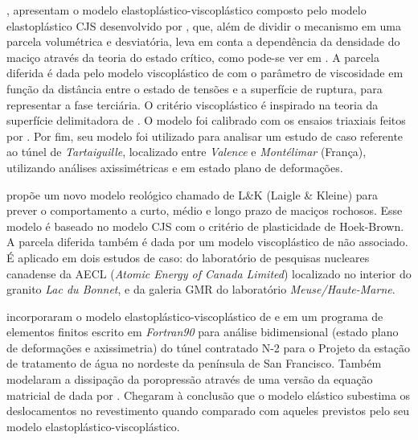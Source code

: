 \textbf{}, apresentam o modelo elastoplástico-viscoplástico composto pelo modelo elastoplástico CJS desenvolvido por , que, além de dividir o mecanismo em uma parcela volumétrica e desviatória, leva em conta a dependência da densidade do maciço através da teoria do estado crítico, como pode-se ver em . A parcela diferida é dada pelo modelo viscoplástico de  com o parâmetro de viscosidade em função da distância entre o estado de tensões e a superfície de ruptura, para representar a fase terciária. O critério viscoplástico é inspirado na teoria da superfície delimitadora de . O modelo foi calibrado com os ensaios triaxiais feitos por . Por fim, seu modelo foi utilizado para analisar um estudo de caso referente ao túnel de \textit{Tartaiguille}, localizado entre \textit{Valence} e \textit{Montélimar} (França), utilizando análises axissimétricas e em estado plano de deformações.

\textbf{} propõe um novo modelo reológico chamado de L\&K (Laigle \& Kleine) para prever o comportamento a curto, médio e longo prazo de maciços rochosos. Esse modelo é baseado no modelo CJS com o critério de plasticidade de Hoek-Brown. A parcela diferida também é dada por um modelo viscoplástico de  não associado. É aplicado em dois estudos de caso: do laboratório de pesquisas nucleares canadense da AECL (\textit{Atomic Energy of Canada Limited}) localizado no interior do granito \textit{Lac du Bonnet}, e da galeria GMR do laboratório \textit{Meuse/Haute-Marne}.

\textbf{} incorporaram o modelo elastoplástico-viscoplástico de  e  em um programa de elementos finitos escrito em \textit{Fortran90} para análise bidimensional (estado plano de deformações e axissimetria) do túnel contratado N-2 para o Projeto da estação de tratamento de água no nordeste da península de San Francisco. Também modelaram a dissipação da poropressão através de uma versão da equação matricial de  dada por . Chegaram à conclusão que o modelo elástico subestima os deslocamentos no revestimento quando comparado com aqueles previstos pelo seu modelo elastoplástico-viscoplástico.

